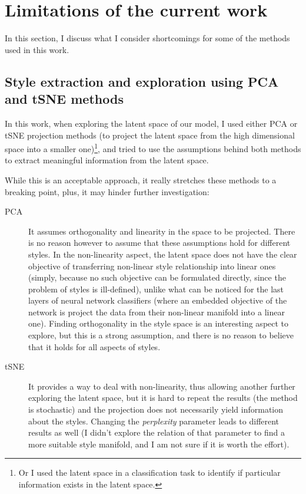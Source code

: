 \section{Limitations of the current work}
  In this section, I discuss what I consider shortcomings for some of the methods used in this work.

  \subsection{Style extraction and exploration using PCA and tSNE methods}
    In this work, when exploring the latent space of our model, I used either PCA or tSNE projection methods (to project the latent space from the high dimensional space into a smaller one)\footnote{Or I used the latent space in a classification task to identify if particular information exists in the latent space.}, and tried to use the assumptions behind both methods to extract meaningful information from the latent space.

    While this is an acceptable approach, it really stretches these methods to a breaking point, plus, it may hinder further investigation:

    \begin{description}
      \item[PCA] It assumes orthogonality and linearity in the space to be projected. There is no reason however to assume that these assumptions hold for different styles.
      In the non-linearity aspect, the latent space does not have the clear objective of transferring non-linear style relationship into linear ones (simply, because no such objective can be formulated directly, since the problem of styles is ill-defined), unlike what can be noticed for the last layers of neural network classifiers (where an embedded objective of the network is project the data from their non-linear manifold into a linear one). Finding orthogonality in the style space is an interesting aspect to explore, but this is a strong assumption, and there is no reason to believe that it holds for all aspects of styles.
      \item[tSNE] It provides a way to deal with non-linearity, thus allowing another further exploring the latent space, but it is hard to repeat the results (the method is stochastic) and the projection does not necessarily yield information about the styles. Changing the \textit{perplexity} parameter leads to different results as well (I didn't explore the relation of that parameter to find a more suitable style manifold, and I am not sure if it is worth the effort).
    \end{description}

